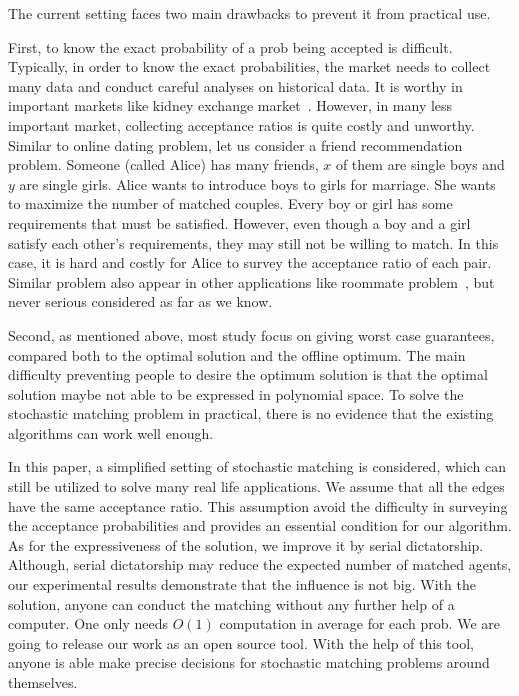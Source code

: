 \documentclass[letterpaper]{article}
\begin{document}
The current setting faces two main drawbacks to prevent it from practical use.

First, to know the exact probability of a prob being accepted is difficult.
Typically, in order to know the exact probabilities, the market needs to collect many data and conduct careful analyses on historical data.
It is worthy in important markets like kidney exchange market~\cite{dickerson2013failure,dickerson2015futurematch}.
However, in many less important market, collecting acceptance ratios is quite costly and unworthy.
Similar to online dating problem, let us consider a friend recommendation problem.
Someone (called Alice) has many friends, $x$ of them are single boys and $y$ are single girls.
Alice wants to introduce boys to girls for marriage.
She wants to maximize the number of matched couples.
Every boy or girl has some requirements that must be satisfied.
However, even though a boy and a girl satisfy each other's requirements, they may still not be willing to match.
In this case, it is hard and costly for Alice to survey the acceptance ratio of each pair.
Similar problem also appear in other applications like roommate problem~\cite{roth1982incentive}, but never serious considered as far as we know.

Second, as mentioned above, most study focus on giving worst case guarantees, compared both to the optimal solution and the offline optimum. 
The main difficulty preventing people to desire the optimum solution is that the optimal solution maybe not able to be expressed in polynomial space.
To solve the stochastic matching problem in practical, there is no evidence that the existing algorithms can work well enough.

In this paper, a simplified setting of stochastic matching is considered, which can still be utilized to solve many real life applications.
We assume that all the edges have the same acceptance ratio.
This assumption avoid the difficulty in surveying the acceptance probabilities and provides an essential condition for our algorithm.
As for the expressiveness of the solution, we improve it by serial dictatorship.
Although, serial dictatorship may reduce the expected number of matched agents, our experimental results demonstrate that the influence is not big.
With the solution, anyone can conduct the matching without any further help of a computer. 
One only needs $O(1)$ computation in average for each prob.
We are going to release our work as an open source tool. 
With the help of this tool, anyone is able make precise decisions for stochastic matching problems around themselves. 
\end{document}
